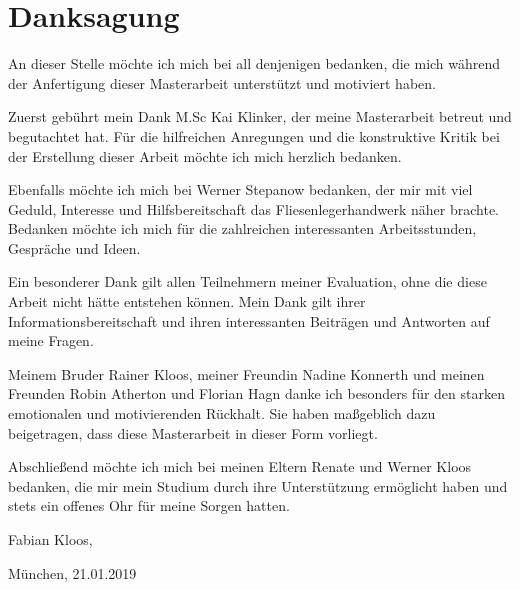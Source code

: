 \chapter*{Danksagung}

An dieser Stelle möchte ich mich bei all denjenigen bedanken, die mich während der Anfertigung dieser Masterarbeit unterstützt und motiviert haben.

Zuerst gebührt mein Dank M.Sc Kai Klinker, der meine Masterarbeit betreut und begutachtet hat. Für die hilfreichen Anregungen und die konstruktive Kritik bei der Erstellung dieser Arbeit möchte ich mich herzlich bedanken.

Ebenfalls möchte ich mich bei Werner Stepanow bedanken, der mir mit viel Geduld, Interesse und Hilfsbereitschaft das Fliesenlegerhandwerk näher brachte. Bedanken möchte ich mich für die zahlreichen interessanten Arbeitsstunden, Gespräche und Ideen.

Ein besonderer Dank gilt allen Teilnehmern meiner Evaluation, ohne die diese Arbeit nicht hätte entstehen können. Mein Dank gilt ihrer Informationsbereitschaft und ihren interessanten Beiträgen und Antworten auf meine Fragen.

Meinem Bruder Rainer Kloos, meiner Freundin Nadine Konnerth und meinen Freunden Robin Atherton und Florian Hagn danke ich besonders für den starken emotionalen und motivierenden Rückhalt. Sie haben maßgeblich dazu beigetragen, dass diese Masterarbeit in dieser Form vorliegt.

Abschließend möchte ich mich bei meinen Eltern Renate und Werner Kloos bedanken, die mir mein Studium durch ihre Unterstützung ermöglicht haben und stets ein offenes Ohr für meine Sorgen hatten.

Fabian Kloos,

München, 21.01.2019